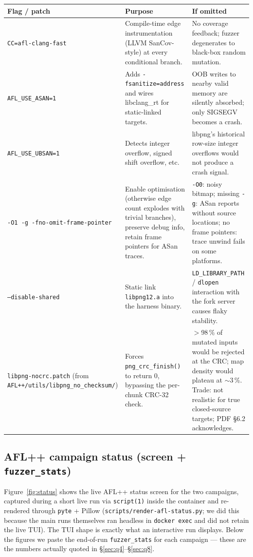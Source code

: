 \documentclass[letterpaper,twocolumn,10pt]{article}
\begin{document}
\begin{center}\footnotesize
\begin{tabular}{p{} p{} p{}}
\toprule
Flag / patch & Purpose & If omitted \\
\midrule
\texttt{CC=afl-clang-fast} & Compile-time edge instrumentation (LLVM SanCov-style) at every conditional branch. & No coverage feedback; fuzzer degenerates to black-box random mutation. \\
\texttt{AFL\_USE\_ASAN=1} & Adds \texttt{-fsanitize=address} and wires libclang\_rt for static-linked targets. & OOB writes to nearby valid memory are silently absorbed; only SIGSEGV becomes a crash. \\
\texttt{AFL\_USE\_UBSAN=1} & Detects integer overflow, signed shift overflow, etc. & libpng's historical row-size integer overflows would not produce a crash signal. \\
\texttt{-O1 -g -fno-omit-frame-pointer} & Enable optimisation (otherwise edge count explodes with trivial branches), preserve debug info, retain frame pointers for ASan traces. & \texttt{-O0}: noisy bitmap; missing \texttt{-g}: ASan reports without source locations; no frame pointers: trace unwind fails on some platforms. \\
\texttt{--disable-shared} & Static link \texttt{libpng12.a} into the harness binary. & \texttt{LD\_LIBRARY\_PATH} / \texttt{dlopen} interaction with the fork server causes flaky stability. \\
\texttt{libpng-nocrc.patch} (from \texttt{AFL++/utils/libpng\_no\_checksum/}) & Forces \texttt{png\_crc\_finish()} to return 0, bypassing the per-chunk CRC-32 check. & $>$98\,\% of mutated inputs would be rejected at the CRC; map density would plateau at $\sim$3\,\%. Trade: not realistic for true closed-source targets; PDF §6.2 acknowledges. \\
\bottomrule
\end{tabular}
\end{center}

\subsection{AFL++ campaign status (screen + \texttt{fuzzer\_stats})}
\label{app:status}
Figure~\ref{fig:status} shows the live AFL++ status screen for the two
campaigns, captured during a short live run via
\verb|script(1)| inside the container and re-rendered through
\verb|pyte| + Pillow (\verb|scripts/render-afl-status.py|; we did this
because the main runs themselves ran headless in
\texttt{docker exec} and did not retain the live TUI). The TUI shape is
exactly what an interactive run displays. Below the figures we paste the
end-of-run \texttt{fuzzer\_stats} for each campaign --- these are the
numbers actually quoted in §\ref{sec:q4}--§\ref{sec:q8}.
\end{document}
